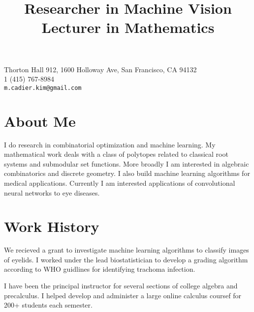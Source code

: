 \documentclass[margin,line,pifont,palatino,courier]{res}
\begin{document}


\begin{resume}




\begin{flushright}
{\small
Thorton Hall 912, 1600 Holloway Ave, San Francisco, CA 94132 \\
1 (415) 767-8984\\
  \verb+m.cadier.kim@gmail.com+
}
\end{flushright}
 
\section{\sc  About Me}
  I do research in combinatorial optimization and machine learning.  My mathematical work deals with a class of polytopes related to classical root systems and submodular set functions. More broadly I am interested in algebraic combinatorics and discrete geometry.  I also build machine learning algorithms for medical applications.  Currently I am interested applications of convolutional neural networks to eye diseases.


\section{\sc  Work History}
  
  
    \title{ Researcher in Machine Vision  }

    \begin{position}
    We recieved a grant to investigate machine learning algorithms to classify images of eyelids. I worked under the lead biostatistician to develop a grading algorithm according to WHO guidlines for identifying trachoma infection.
    \end{position}
  
    \title{ Lecturer in Mathematics  }

    \begin{position}
    I have been the principal instructor for several sections of college algebra and precalculus.  I helped develop and administer a large online calculus coursef for 200+ students each semester. 
    \end{position}
  

\end{resume}
\end{document}
